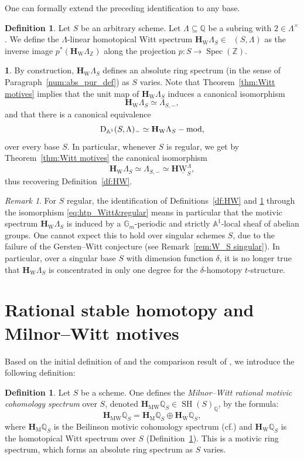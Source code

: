 \documentclass[11pt]{article}
\newcommand{\cf}{cf.\xspace}
\numberwithin{equation}{section}\renewcommand{\encodingdefault}{TU}
\newcommand{\tstructure}{$t$-structure\xspace}
\newcommand{\modl}[1]{#1\textnormal{-}\mathrm{mod}}
\renewcommand{\AA}{\mathbb A}
\newcommand{\HuW}{\mathbf H \underline{\mathrm W}}
\newcommand{\HM}{\mathbf H_{\mathrm{M}}}
\newcommand{\HMW}{\mathbf H_{\mathrm{MW}}}
\newcommand{\HW}{\mathbf H_{\mathrm{W}}}
\DeclareMathOperator{\SH}{SH}
\DeclareMathOperator{\DA}{D_{\AA^1}}
\DeclareMathOperator{\spec}{Spec}
\newcommand{\ZZ} {\mathbb Z}
\newcommand{\QQ} {\mathbb Q}
\newcommand{\GG} {\mathbb{G}_m}
\theoremstyle{remark}
\newtheorem{rem}[thm]{Remark}
\theoremstyle{definition}
\newtheorem{df}[thm]{Definition}
\newtheorem{num}[thm]{}
\numberwithin{equation}{thm}
\begin{document}
One can formally extend the preceding identification to any base.

\begin{df}\label{df:htp_Witt_singular}
Let $S$ be an arbitrary scheme.
Let $\Lambda \subseteq \QQ$ be a subring with $2 \in \Lambda^\times$.
We define the $\Lambda$-linear homotopical Witt spectrum $\HW \Lambda_S \in \DA(S,\Lambda)$ as the inverse image $p^*(\HW \Lambda_\ZZ)$ along the projection $p:S \to \spec(\ZZ)$.
\end{df}

\begin{num}\label{num:homotopical_Witt}
By construction, $\HW \Lambda_S$ defines an absolute ring spectrum (in the sense of Paragraph~\ref{num:abs_pur_def}) as $S$ varies.
Note that Theorem~\ref{thm:Witt motives} implies that the unit map of $\HW \Lambda_S$ induces a canonical isomorphism
\[
\HW \Lambda_S \simeq \Lambda_{S,-},
\]
and that there is a canonical equivalence
\[\DA(S,\Lambda)_- \simeq \modl{\HW \Lambda_S},\]
over every base $S$.
In particular, whenever $S$ is regular, we get by Theorem~\ref{thm:Witt motives} the canonical isomorphism
\begin{equation}\label{eq:htp_Witt&regular}
\HW \Lambda_S \simeq \Lambda_{S,-} \simeq \HuW^\Lambda_S,
\end{equation}
thus recovering Definition~\ref{df:HW}.
\end{num}

\begin{rem}\label{rem:htp_Witt_singular}
For $S$ regular, the identification of Definitions~\ref{df:HW} and \ref{df:htp_Witt_singular} through the isomorphism \eqref{eq:htp_Witt&regular} means in particular that the motivic spectrum $\HW \Lambda_S$ is induced by
a $\GG$-periodic and strictly $\AA^1$-local sheaf of abelian groups.
One cannot expect this to hold over singular schemes $S$, due to the failure of the Gersten--Witt conjecture (see Remark~\ref{rem:W_S singular}). In particular, over a singular base $S$ with dimension function $\delta$, it is no longer true that $\HW \Lambda_S$ is concentrated in only one degree for the $\delta$-homotopy \tstructure.
\end{rem}

\section{Rational stable homotopy and Milnor--Witt motives}
\label{sec:MW}

Based on the initial definition of \cite[Chap.\,3 \& 6]{BCDFO} and the comparison result
of \cite[4.2]{Garkusha}, we introduce the following definition:
\begin{df}\label{df:HMWQ}
Let $S$ be a scheme. One defines the
\emph{Milnor--Witt rational motivic cohomology spectrum} over $S$, denoted $\HMW \QQ_S \in \SH(S)_\QQ$, by the formula:
\[
\HMW \QQ_S=\HM \QQ_S \oplus \HW \QQ_S,
\]
where $\HM \QQ_S$ is the Beilinson motivic cohomology spectrum (\cf \cite[14.1.2]{CD3})
and $\HW \QQ_S$ is the homotopical Witt spectrum over $S$
(Definition~\ref{df:htp_Witt_singular}).
This is a motivic ring spectrum, which forms an absolute ring spectrum as $S$ varies.
\end{df}
\end{document}

